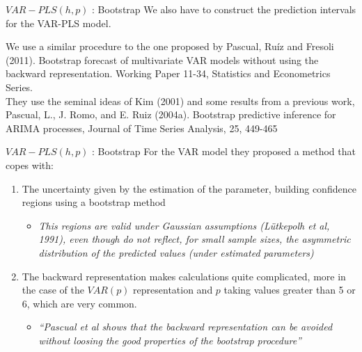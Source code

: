 \documentclass{beamer}
\newcommand{\?}{?`}
\begin{document}
\begin{frame}{$VAR-PLS(h,p)$ : Bootstrap}
\bigskip
  We also have to construct the prediction intervals for the VAR-PLS model.\\

\bigskip

We use a similar procedure to the one proposed by Pascual, Ru\'iz and Fresoli (2011).
Bootstrap forecast of multivariate VAR models without using the backward representation. Working Paper 11-34, Statistics and Econometrics Series. \\

They use the seminal ideas of Kim (2001) and some results from a previous work,
Pascual, L., J. Romo, and E. Ruiz (2004a).
Bootstrap predictive inference for ARIMA processes, Journal of Time Series Analysis, 25, 449-465
\end{frame}


\begin{frame}{$VAR-PLS(h,p)$ : Bootstrap}
For the  VAR model they proposed a method that copes with:
 \medskip
   \begin{enumerate}
  \item The uncertainty given by the estimation of the parameter, building confidence regions using a bootstrap method
  \begin{itemize}
    \item {\it{This regions are valid under Gaussian assumptions (L\"utkepolh et al, 1991), even though do not reflect, for small sample sizes, the asymmetric distribution of the predicted values (under estimated parameters)}}
    \end{itemize}
  \item The backward representation makes calculations quite complicated, more in the case of the $VAR(p)$ representation and $p$ taking values greater than 5 or 6, which are very common.
    \begin{itemize}
    \item {\it{``Pascual et al shows that the backward representation can be avoided without loosing the good properties of the bootstrap procedure''   }}
    \end{itemize}
  \end{enumerate}
\end{frame}
\end{document}
